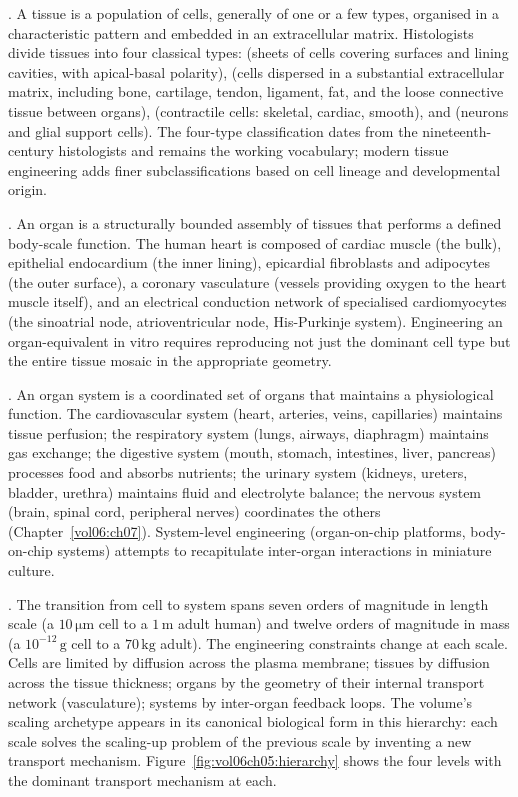 . A tissue is a population of cells, generally of one
or a few types, organised in a characteristic pattern and embedded in
an extracellular matrix. Histologists divide tissues into four
classical types:  (sheets of cells covering
surfaces and lining cavities, with apical-basal polarity), 
(cells dispersed in a substantial extracellular matrix, including
bone, cartilage, tendon, ligament, fat, and the loose connective
tissue between organs),  (contractile cells:
skeletal, cardiac, smooth), and  (neurons and glial
support cells). The four-type classification dates from the
nineteenth-century histologists and remains the working vocabulary;
modern tissue engineering adds finer subclassifications based on
cell lineage and developmental origin.

. An organ is a structurally bounded assembly of
tissues that performs a defined body-scale function. The human heart
is composed of cardiac muscle (the bulk), epithelial endocardium
(the inner lining), epicardial fibroblasts and adipocytes (the outer
surface), a coronary vasculature (vessels providing oxygen to the
heart muscle itself), and an electrical conduction network of
specialised cardiomyocytes (the sinoatrial node, atrioventricular
node, His-Purkinje system). Engineering an organ-equivalent in vitro
requires reproducing not just the dominant cell type but the entire
tissue mosaic in the appropriate geometry.

. An organ system is a coordinated set of organs that
maintains a physiological function. The cardiovascular system
(heart, arteries, veins, capillaries) maintains tissue perfusion;
the respiratory system (lungs, airways, diaphragm) maintains gas
exchange; the digestive system (mouth, stomach, intestines, liver,
pancreas) processes food and absorbs nutrients; the urinary system
(kidneys, ureters, bladder, urethra) maintains fluid and electrolyte
balance; the nervous system (brain, spinal cord, peripheral nerves)
coordinates the others (Chapter~\ref{vol06:ch07}). System-level
engineering (organ-on-chip platforms, body-on-chip systems) attempts
to recapitulate inter-organ interactions in miniature culture.

. The transition from cell
to system spans seven orders of magnitude in length scale (a
$10\,\si{\micro\meter}$ cell to a $1\,\text{m}$ adult human) and
twelve orders of magnitude in mass (a $10^{-12}\,\text{g}$ cell to a
$70\,\text{kg}$ adult). The engineering constraints change at each
scale. Cells are limited by diffusion across the plasma membrane;
tissues by diffusion across the tissue thickness; organs by the
geometry of their internal transport network (vasculature); systems
by inter-organ feedback loops. The volume's scaling archetype
appears in its canonical biological form in this hierarchy: each
scale solves the scaling-up problem of the previous scale by
inventing a new transport mechanism. Figure~\ref{fig:vol06ch05:hierarchy}
shows the four levels with the dominant transport mechanism at each.

